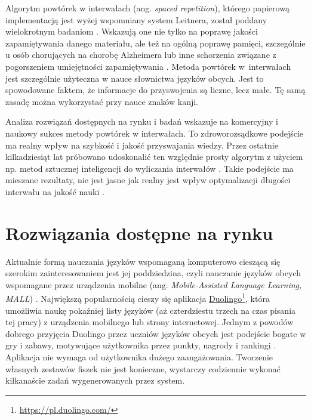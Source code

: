 \documentclass[a4paper,twoside,12pt]{book}
\newcommand{\obcy}[1]{\emph{#1}}
\newcommand{\english}[1]{{\selectlanguage{british}\obcy{#1}}}
\begin{document}
Algorytm powtórek w interwałach (ang. \english{spaced repetition}), którego papierową implementacją jest wyżej wspomniany system Leitnera, został poddany wielokrotnym badaniom \cite{bib:artykulAlzheimer,bib:artykulSpaced}. Wskazują one nie tylko na poprawę jakości zapamiętywania danego materiału, ale też na ogólną poprawę pamięci, szczególnie u osób chorujących na chorobę Alzheimera lub inne schorzenia związane z pogorszeniem umiejętności zapamiętywania \cite{bib:artykulAlzheimer}. Metoda powtórek w~interwałach jest szczególnie użyteczna w nauce słownictwa języków obcych. Jest to spowodowane faktem, że informacje do przyswojenia są liczne, lecz małe. Tę samą zasadę można wykorzystać przy nauce znaków kanji. 

Analiza rozwiązań dostępnych na rynku i badań wskazuje na komercyjny i naukowy sukces metody powtórek w interwałach. To zdroworozsądkowe podejście ma realny wpływ na szybkość i jakość przyswajania wiedzy. Przez ostatnie kilkadziesiąt lat próbowano udoskonalić ten względnie prosty algorytm z użyciem np. metod sztucznej inteligencji do wyliczania interwałów \cite{bib:internetNN, bib:lstms}. Takie podejście ma mieszane rezultaty, nie jest jasne jak realny jest wpływ optymalizacji długości interwału na jakość nauki \cite[rozdział 6]{bib:ksiazkaEssays}.

\section{Rozwiązania dostępne na rynku}

Aktualnie formą nauczania języków wspomaganą komputerowo cieszącą się szerokim zainteresowaniem jest jej poddziedzina, czyli nauczanie języków obcych wspomagane przez urządzenia mobilne (ang. \english{Mobile-Assisted Language Learning, MALL}) \cite{bib:artykulDuolingo}. Największą popularnością \cite{bib:internetDuolingo,bib:artykulDuolingo} cieszy się aplikacja \href{https://pl.duolingo.com/}{Duolingo}\footnote{\url{https://pl.duolingo.com/}}, która umożliwia naukę pokaźniej listy języków (aż czterdziestu trzech na czas pisania tej pracy) z urządzenia mobilnego lub strony internetowej. Jednym z powodów dobrego przyjęcia Duolingo przez uczniów języków obcych jest podejście bogate w gry i zabawy, motywujące użytkownika przez punkty, nagrody i rankingi \cite{bib:artykulDuolingo,bib:duolingoHLR}. Aplikacja nie wymaga od użytkownika dużego zaangażowania. Tworzenie własnych zestawów fiszek nie jest konieczne, wystarczy codziennie wykonać kilkanaście zadań wygenerowanych przez system. 
\end{document}
